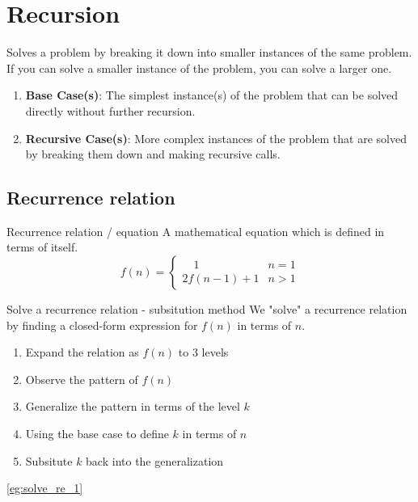 \section{Recursion}

Solves a problem by breaking it down into smaller instances of the same problem. If you can solve a smaller instance of the problem, you can solve a larger one.

\begin{enumerate}
    \item \textbf{Base Case(s)}: The simplest instance(s) of the problem that can be solved directly without further recursion.
    \item \textbf{Recursive Case(s)}: More complex instances of the problem that are solved by breaking them down and making recursive calls.
\end{enumerate}

\subsection{Recurrence relation}

\begin{definition}
    {Recurrence relation / equation}
    A mathematical equation which is defined in terms of itself.
    \[f(n)=\begin{cases}\quad1&n=1\\2f(n-1)+1&n>1\end{cases}\]
\end{definition}

\begin{theorem}
    {Solve a recurrence relation - subsitution method}
    We "solve" a recurrence relation by finding a closed-form expression for $f(n)$ in terms of $n$.
    \begin{enumerate}
        \item Expand the relation as $f(n)$ to 3 levels
        \item Observe the pattern of $f(n)$
        \item Generalize the pattern in terms of the level $k$
        \item Using the base case to define $k$ in terms of $n$
        \item Subsitute $k$ back into the generalization
    \end{enumerate}
    \tcblower
    \ref{eg:solve_re_1}
    \label{thm:solve_re}
\end{theorem}

